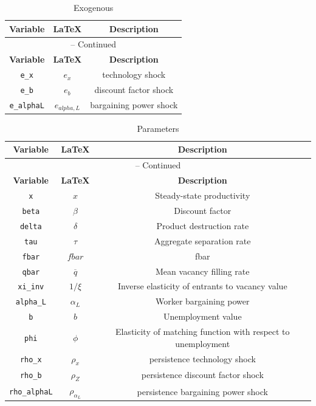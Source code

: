 \begin{center}
\begin{longtable}{ccc}
\caption{Exogenous}\\%
\hline%
\multicolumn{1}{c}{\textbf{Variable}} &
\multicolumn{1}{c}{\textbf{\LaTeX}} &
\multicolumn{1}{c}{\textbf{Description}}\\%
\hline\hline%
\endfirsthead
\multicolumn{3}{c}{{\tablename} \thetable{} -- Continued}\\%
\hline%
\multicolumn{1}{c}{\textbf{Variable}} &
\multicolumn{1}{c}{\textbf{\LaTeX}} &
\multicolumn{1}{c}{\textbf{Description}}\\%
\hline\hline%
\endhead
\texttt{e\_x} & ${e_x}$ & technology shock\\
\texttt{e\_b} & ${e_{b}}$ & discount factor shock\\
\texttt{e\_alphaL} & ${e_{alpha,L}}$ & bargaining power shock\\
\hline%
\end{longtable}
\end{center}
\begin{center}
\begin{longtable}{ccc}
\caption{Parameters}\\%
\hline%
\multicolumn{1}{c}{\textbf{Variable}} &
\multicolumn{1}{c}{\textbf{\LaTeX}} &
\multicolumn{1}{c}{\textbf{Description}}\\%
\hline\hline%
\endfirsthead
\multicolumn{3}{c}{{\tablename} \thetable{} -- Continued}\\%
\hline%
\multicolumn{1}{c}{\textbf{Variable}} &
\multicolumn{1}{c}{\textbf{\LaTeX}} &
\multicolumn{1}{c}{\textbf{Description}}\\%
\hline\hline%
\endhead
\texttt{x} & ${x}$ & Steady-state productivity\\
\texttt{beta} & ${\beta}$ & Discount factor\\
\texttt{delta} & ${\delta}$ & Product destruction rate\\
\texttt{tau} & ${\tau}$ & Aggregate separation rate\\
\texttt{fbar} & $fbar$ & fbar\\
\texttt{qbar} & ${\overline{q}}$ & Mean vacancy filling rate\\
\texttt{xi\_inv} & ${1/\xi}$ & Inverse elasticity of entrants to vacancy value\\
\texttt{alpha\_L} & $\alpha_L$ & Worker bargaining power\\
\texttt{b} & $b$ & Unemployment value\\
\texttt{phi} & $\phi$ & Elasticity of matching function with respect to unemployment\\
\texttt{rho\_x} & ${\rho_x}$ & persistence technology shock\\
\texttt{rho\_b} & ${\rho_Z}$ & persistence discount factor shock\\
\texttt{rho\_alphaL} & ${\rho_{\alpha_L}}$ & persistence bargaining power shock\\
\hline%
\end{longtable}
\end{center}
